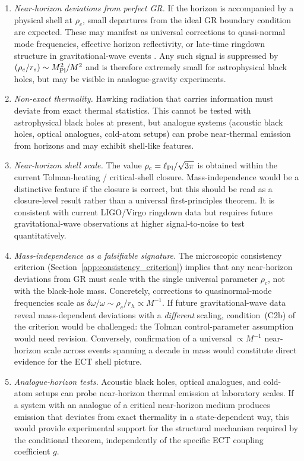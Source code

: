 \documentclass[11pt,a4paper]{article}
\numberwithin{equation}{section}
\begin{document}
\begin{enumerate}
\item \emph{Near-horizon deviations from perfect GR.}
If the horizon is accompanied by a physical shell at $\rho_c$,
small departures from the ideal GR boundary condition are expected.
These may manifest as universal corrections to quasi-normal mode
frequencies, effective horizon reflectivity, or late-time ringdown
structure in gravitational-wave events
\cite{Almheiri2013}.
Any such signal is suppressed by $(\rho_c/r_s)\sim M_{\rm Pl}^2/M^2$
and is therefore extremely small for astrophysical black holes, but
may be visible in analogue-gravity experiments.

\item \emph{Non-exact thermality.}
Hawking radiation that carries information must deviate from exact
thermal statistics.
This cannot be tested with astrophysical black holes at present, but
analogue systems (acoustic black holes, optical analogues, cold-atom
setups) can probe near-thermal emission from horizons and may exhibit
shell-like features.

\item \emph{Near-horizon shell scale.}
The value $\rho_c = \ell_{\rm Pl}/\sqrt{3\pi}$ is obtained within
the current Tolman-heating / critical-shell closure.
Mass-independence would be a distinctive feature if the closure is correct,
but this should be read as a closure-level result rather than a
universal first-principles theorem.
It is consistent with current LIGO/Virgo ringdown data but requires
future gravitational-wave observations at higher signal-to-noise to
test quantitatively.

\item \emph{Mass-independence as a falsifiable signature.}
The microscopic consistency criterion (Section~\ref{app:consistency_criterion})
implies that any near-horizon deviations from GR must scale with the single
universal parameter $\rho_c$, not with the black-hole mass.
Concretely, corrections to quasinormal-mode frequencies scale as
$\delta\omega/\omega \sim \rho_c/r_h \propto M^{-1}$.
If future gravitational-wave data reveal mass-dependent deviations with a
\emph{different} scaling, condition~(C2b) of the criterion would be
challenged: the Tolman control-parameter assumption would need revision.
Conversely, confirmation of a universal $\propto M^{-1}$ near-horizon scale
across events spanning a decade in mass would constitute direct evidence
for the ECT shell picture.

\item \emph{Analogue-horizon tests.}
Acoustic black holes, optical analogues, and cold-atom setups can probe
near-horizon thermal emission at laboratory scales.
If a system with an analogue of a critical near-horizon medium produces
emission that deviates from exact thermality in a state-dependent way,
this would provide experimental support for the structural mechanism
required by the conditional theorem, independently of the specific ECT
coupling coefficient $g$.
\end{enumerate}
\end{document}
